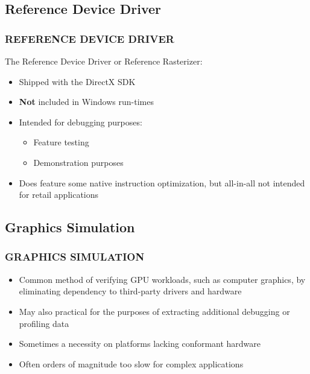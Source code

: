 \subsection{Reference Device Driver}
\begin{frame}
\frametitle{REFERENCE DEVICE DRIVER}

The Reference Device Driver or Reference Rasterizer:
\begin{itemize}
\item Shipped with the DirectX SDK
\item \textbf{Not} included in Windows run-times
\item Intended for debugging purposes:
  \begin{itemize}
  \item Feature testing
  \item Demonstration purposes
  \end{itemize}
\item Does feature some native instruction optimization, but all-in-all not intended for retail applications
\end{itemize}

\end{frame}

\subsection{Graphics Simulation}
\begin{frame}
\frametitle{GRAPHICS SIMULATION}

\begin{itemize}
\item Common method of verifying GPU workloads, such as computer graphics, by eliminating dependency to third-party drivers and hardware
\item May also practical for the purposes of extracting additional debugging or profiling data
\item Sometimes a necessity on platforms lacking conformant hardware
\item Often orders of magnitude too slow for complex applications
\end{itemize}

\end{frame}

